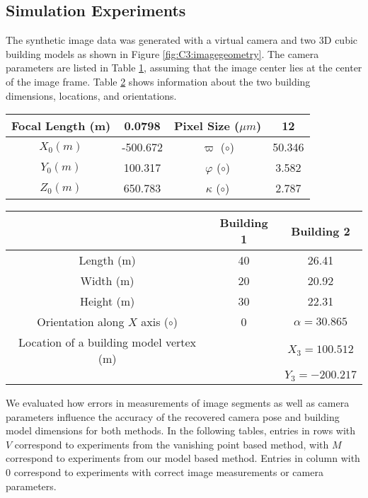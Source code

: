 \subsection{Simulation Experiments}

The synthetic image data was generated with a virtual camera and two 3D cubic building models as shown in Figure \ref{fig:C3:imagegeometry}. The camera parameters are listed in Table \ref {table:C3:VirtualCameraPs}, assuming that the image center lies at the center of the image frame. Table \ref{table:C3:VirtualBuildingPs} shows information about the two building dimensions, locations, and orientations. 

\begin{table}
\centering
{}
\begin{tabular}{|c|c|c|c|}
\hline
Focal Length (m) & 0.0798 & Pixel Size ($\mu m$) & 12 \\
\hline
$X_0 (m)$ & -500.672  &  $\varpi$ ($\circ$)  &  50.346      \\
\hline
$Y_0 (m)$  &  100.317 &  $\varphi$ ($\circ$) & 3.582 \\
\hline
$Z_0 (m)$  &  650.783 &  $\kappa$ ($\circ$) & 2.787 \\
\hline

\end{tabular}
\label{table:C3:VirtualCameraPs}
\end{table}

\begin{table}
\centering
{}
\begin{tabular}{|c|c|c|}
\hline
& Building 1 & Building 2 \\
\hline
Length (m) & 40  &  26.41   \\
\hline
Width (m)  & 20 &  20.92 \\
\hline
Height (m) &  30 & 22.31 \\
\hline
Orientation along $X$ axis ($\circ$) & 0 & $\alpha = 30.865$ \\
\hline
Location of a building model vertex (m)   & &    $X_3 = 100.512$ \\ \cline{3-3}
&   & $Y_3 = -200.217$ \\
\hline

\end{tabular}
\label{table:C3:VirtualBuildingPs}
\end{table}

We evaluated how errors in measurements of image segments as well as camera parameters influence the accuracy of the recovered camera pose and building model dimensions for both methods.  In the following tables, entries in rows with $V$ correspond to experiments from the vanishing point based method, with $M$ correspond to experiments from our model based method. Entries in column with 0 correspond to experiments with correct image measurements or camera parameters.  


